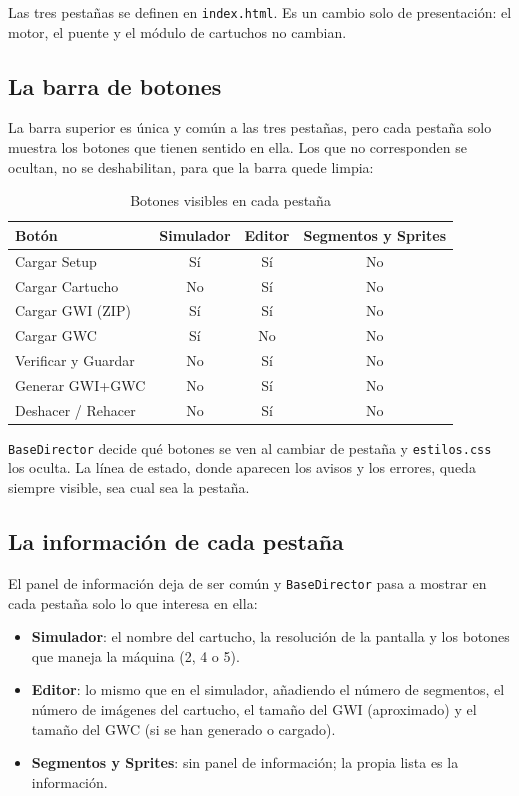 Las tres pestañas se definen en \texttt{index.html}. Es un cambio
solo de presentación: el motor, el puente y el módulo de cartuchos no
cambian.

\subsection{La barra de botones}
\label{sec:F5I7Botones}

La barra superior es única y común a las tres pestañas, pero cada
pestaña solo muestra los botones que tienen sentido en ella. Los que no
corresponden se ocultan, no se deshabilitan, para que la barra quede
limpia:

\begin{table}[H]
	\centering
	\begin{tabular}{lccc}
		\hline
		\textbf{Botón} & \textbf{Simulador} & \textbf{Editor} & \textbf{Segmentos y Sprites} \\
		\hline
		Cargar Setup        & Sí & Sí & No \\
		Cargar Cartucho\footnotemark & No & Sí & No \\
		Cargar GWI (ZIP)    & Sí & Sí & No \\
		Cargar GWC          & Sí & No & No \\
		Verificar y Guardar & No & Sí & No \\
		Generar GWI+GWC     & No & Sí & No \\
		Deshacer / Rehacer  & No & Sí & No \\
		\hline
	\end{tabular}
	\caption{Botones visibles en cada pestaña}
	\label{tab:F5I7Botones}
\end{table}


\texttt{BaseDirector} decide qué botones se ven al cambiar de pestaña
y \texttt{estilos.css} los oculta. La línea de estado, donde aparecen
los avisos y los errores, queda siempre visible, sea cual sea la
pestaña.

\subsection{La información de cada pestaña}
\label{sec:F5I7Informacion}

El panel de información deja de ser común y \texttt{BaseDirector} pasa
a mostrar en cada pestaña solo lo que interesa en ella:

\begin{itemize}
	\item \textbf{Simulador}: el nombre del cartucho, la resolución de
	la pantalla y los botones que maneja la máquina (2, 4 o 5).
	
	\item \textbf{Editor}: lo mismo que en el simulador, añadiendo el
	número de segmentos, el número de imágenes del cartucho, el tamaño
	del GWI (aproximado) y el tamaño del GWC (si se han generado o cargado).

	\item \textbf{Segmentos y Sprites}: sin panel de información; la propia lista
	es la información.
\end{itemize}

